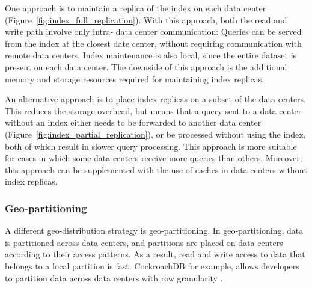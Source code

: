 One approach is to maintain a replica of the index on each data center (Figure~\ref{fig:index_full_replication}).
With this approach, both the read and write path involve only intra- data center communication:
Queries can be served from the index at the closest date center, without requiring communication with
remote data centers.
Index maintenance is also local, since the entire dataset is present on each data center.
The downside of this approach is the additional memory and storage resources required for maintaining index replicas.

An alternative approach is to place index replicas on a subset of the data centers.
This reduces the storage overhead, but means that a query sent to a data center without an index
either needs to be forwarded to another data center (Figure~\ref{fig:index_partial_replication}), or be processed without using the index,
both of which result in slower query processing.
This approach is more suitable for cases in which some data centers receive more queries than others.
Moreover, this approach can be supplemented with the use of caches in data centers without index replicas.


\subsubsection{Geo-partitioning}
A different geo-distribution strategy is geo-partitioning.
In geo-partitioning, data is partitioned across data centers, and partitions are placed on data centers according to
their access patterns.
As a result, read and write access to data that belongs to a local partition is fast.
CockroachDB for example, allows developers to partition data across data centers with row granularity
\cite{cockroachdb:geopartitioning}.

